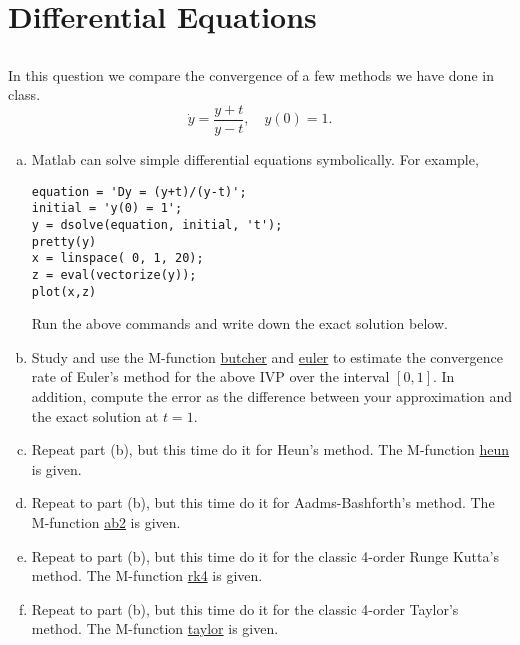 \chapter{Differential Equations}

\section{}
In this question we compare the convergence of a few methods we have done in class.
\[ \dot{y}=\frac{y+t}{y-t}, \quad y(0)=1. \]
\begin{enumerate}[(a)]
	\item Matlab can solve simple differential equations symbolically.
	For example,
	\begin{lstlisting}[style=Matlab-editor]
equation = 'Dy = (y+t)/(y-t)';
initial = 'y(0) = 1';
y = dsolve(equation, initial, 't');
pretty(y)
x = linspace( 0, 1, 20);
z = eval(vectorize(y));
plot(x,z)
	\end{lstlisting}
	Run the above commands and write down the exact solution below.
	\item Study and use the M-function \hyperref[butcher]{butcher} and \hyperref[euler]{euler} to estimate the convergence rate of Euler's method for the above IVP over the interval \([0, 1]\).
	In addition, compute the error as the difference between your approximation and the exact solution at \(t = 1\).
	\item Repeat part (b), but this time do it for Heun's method.
	The M-function \hyperref[heun]{heun} is given.
	\item Repeat to part (b), but this time do it for Aadms-Bashforth's method.
	The M-function \hyperref[ab2]{ab2} is given.
	\item Repeat to part (b), but this time do it for the classic 4-order Runge Kutta's method.
	The M-function \hyperref[rk4]{rk4} is given.
	\item Repeat to part (b), but this time do it for the classic 4-order Taylor's method.
	The M-function \hyperref[taylor]{taylor} is given.
\end{enumerate}


